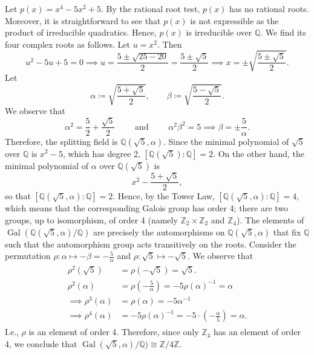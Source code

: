 \documentclass{article}
\begin{document}
\begin{solutions}
	Let $p(x) = x^{4} - 5x^{2} + 5$. By the rational root test, $p(x)$ has no rational roots. Moreover, it is straightforward to see that $p(x)$ is not expressible as the product of irreducible quadratics. Hence, $p(x)$ is irreducible over $\mathbb{Q}$. We find its four complex roots as follows. Let $u = x^{2}$. Then 
		\begin{equation}
			u^{2} - 5u + 5 = 0 \implies u = \frac{5 \pm \sqrt{25 - 20}}{2} = \frac{5 \pm \sqrt{5}}{2} \implies x = \pm \sqrt{\frac{5 \pm \sqrt{5}}{2}}. 
		\end{equation}
	Let
		\begin{equation}
			\alpha \coloneqq \sqrt{\frac{5 + \sqrt{5}}{2}}, \qquad \beta \coloneqq \sqrt{\frac{5 - \sqrt{5}}{2}}. 
		\end{equation}
	We observe that 
		\begin{equation}
			\alpha^{2} = \frac{5}{2} + \frac{\sqrt{5}}{2} \qquad \text{ and } \qquad \alpha^{2}\beta^{2} = 5 \implies \beta = \pm \frac{5}{\alpha}. 
		\end{equation}
	Therefore, the splitting field is $\mathbb{Q}(\sqrt{5}, \alpha)$. Since the minimal polynomial of $\sqrt{5}$ over $\mathbb{Q}$ is $x^{2} - 5$, which has degree 2, $[\mathbb{Q}(\sqrt{5}):\mathbb{Q}] = 2$. On the other hand, the minimal polynomial of $\alpha$ over $\mathbb{Q}(\sqrt{5})$ is 
		\begin{equation}
			x^{2} - \frac{5 + \sqrt{5}}{2},
		\end{equation}
	so that $[\mathbb{Q}(\sqrt{5},\alpha):\mathbb{Q}] = 2$. Hence, by the Tower Law, $[\mathbb{Q}(\sqrt{5},\alpha): \mathbb{Q}] = 4$, which means that the corresponding Galois group has order 4; there are two groups, up to isomorphism, of order 4 (namely $\mathbb{Z}_{2} \times \mathbb{Z}_{2}$ and $\mathbb{Z}_{4}$). The elements of $\operatorname{Gal}(\mathbb{Q}(\sqrt{5}, \alpha)/\mathbb{Q})$ are precisely the automorphisms on $\mathbb{Q}(\sqrt{5}, \alpha)$ that fix $\mathbb{Q}$ such that the automorphism group acts transitively on the roots. Consider the permutation $\rho: \alpha \mapsto -\beta = -\frac{5}{\alpha}$ and $\rho: \sqrt{5} \mapsto -\sqrt{5}$. We observe that 
		\begin{align}
			\begin{split}
				\rho^{2}(\sqrt{5}) &= \rho(-\sqrt{5}) = \sqrt{5}. \\
				\rho^{2}(\alpha) &= \rho\left(-\frac{5}{\alpha}\right) = -5\rho(\alpha)^{-1} = \alpha  \\
				\implies \rho^{3}(\alpha) &= \rho(\alpha) = -5\alpha^{-1} \\
				\implies \rho^{4}(\alpha) &= -5\rho(\alpha)^{-1} = -5 \cdot \left(-\frac{\alpha}{5}\right) = \alpha. 
			\end{split}
		\end{align}
	I.e., $\rho$ is an element of order 4. Therefore, since only $\mathbb{Z}_{4}$ has an element of order 4, we conclude that $\operatorname{Gal}(\sqrt{5}, \alpha)/\mathbb{Q}) \cong \mathbb{Z}/4\mathbb{Z}$. 
\end{solutions}
\end{document}
